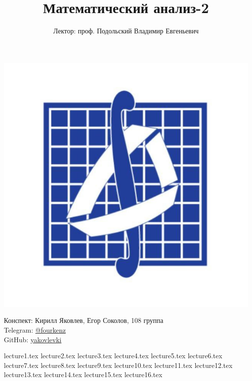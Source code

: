\documentclass[a4paper, 12pt]{article}
\title{\textbf{Математический анализ-2}}
\author{Лектор: проф. Подольский Владимир Евгеньевич}
\begin{document}
    
\fontsize{14pt}{20pt}\selectfont
\maketitle
\vspace{0.3cm}
\begin{center}
    \includegraphics[width=0.75\linewidth]{Images/mehmat.png}
\end{center}
\vspace{1.5cm}
\begin{center}
    Конспект: Кирилл Яковлев, Егор Соколов, 108 группа\\
    Telegram: \href{https://t.me/fourkenz}{@fourkenz}\\
    GitHub: \href{https://github.com/yakovlevki}{yakovlevki}\\
\end{center}
    
\newpage
\tableofcontents
\newpage

{lecture1.tex}
{lecture2.tex}
{lecture3.tex}
{lecture4.tex}
{lecture5.tex}
{lecture6.tex}
{lecture7.tex}
{lecture8.tex}
{lecture9.tex}
{lecture10.tex}
{lecture11.tex}
{lecture12.tex}
{lecture13.tex}
{lecture14.tex}
{lecture15.tex}
{lecture16.tex}
\end{document}
